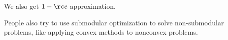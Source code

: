 We also get $1-\rc e$ approximation.


People also try to use submodular optimization to solve non-submodular problems, like applying convex methods to nonconvex problems.





